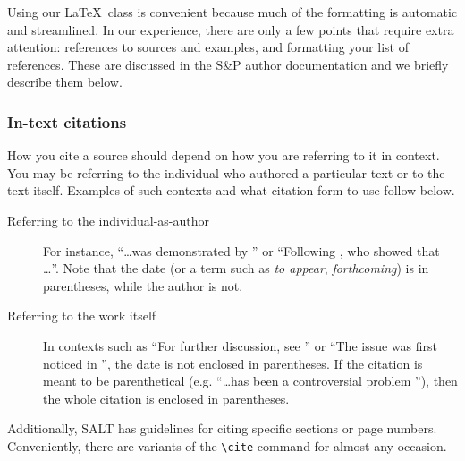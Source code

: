 \documentclass{salt}
\begin{document}
Using our \LaTeX\ class is convenient because much of the formatting is automatic and streamlined. In our experience, there are only a few points that require extra attention: references to sources and examples, and formatting your list of references. These are discussed in the S\&P author documentation and we briefly describe them below.

\subsubsection{In-text citations}

How you cite a source should depend on how you are referring to it in context. You may be referring to the individual who authored a particular text or to the text itself. Examples of such contexts and what citation form to use follow below. 

\begin{description}
\item[Referring to the individual-as-author] For instance, ``\ldots was demonstrated by '' or ``Following \citet{Lewis-1973-counterfactuals}, who showed that \ldots''. Note that the date (or a term such as \textit{to appear}, \textit{forthcoming}) is in parentheses, while the author is not.
\item[Referring to the work itself] In contexts such as ``For further discussion, see '' or ``The issue was first noticed in \citealt{Lewis-1973-counterfactuals}'', the date is not enclosed in parentheses. If the citation is meant to be parenthetical (e.g.  ``\ldots has been a controversial problem \citep{ccs2007, p2011}''), then the whole citation is enclosed in parentheses.
\end{description}

Additionally, SALT has guidelines for citing specific sections or page numbers. Conveniently, there are variants of the \verb+\cite+ command for almost any occasion. 
\end{document}
